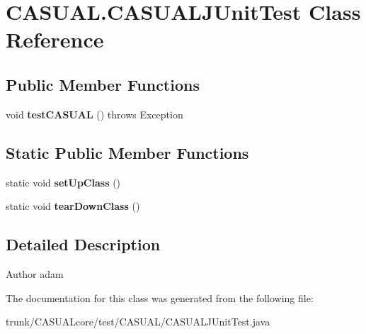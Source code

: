 \hypertarget{classCASUAL_1_1CASUALJUnitTest}{\section{C\-A\-S\-U\-A\-L.\-C\-A\-S\-U\-A\-L\-J\-Unit\-Test Class Reference}
\label{classCASUAL_1_1CASUALJUnitTest}
}
\subsection*{Public Member Functions}
\begin{DoxyCompactItemize}
\item 
\hypertarget{classCASUAL_1_1CASUALJUnitTest_af67e58268d5b80fe18aeb2aea142b7b3}{void {\bfseries test\-C\-A\-S\-U\-A\-L} ()  throws Exception }\label{classCASUAL_1_1CASUALJUnitTest_af67e58268d5b80fe18aeb2aea142b7b3}

\end{DoxyCompactItemize}
\subsection*{Static Public Member Functions}
\begin{DoxyCompactItemize}
\item 
\hypertarget{classCASUAL_1_1CASUALJUnitTest_a9980b2dad35ad98b8b71706481ef0cba}{static void {\bfseries set\-Up\-Class} ()}\label{classCASUAL_1_1CASUALJUnitTest_a9980b2dad35ad98b8b71706481ef0cba}

\item 
\hypertarget{classCASUAL_1_1CASUALJUnitTest_ad619544ffa44246299a867cfb80ef7fa}{static void {\bfseries tear\-Down\-Class} ()}\label{classCASUAL_1_1CASUALJUnitTest_ad619544ffa44246299a867cfb80ef7fa}

\end{DoxyCompactItemize}


\subsection{Detailed Description}
\begin{DoxyAuthor}{Author}
adam 
\end{DoxyAuthor}


The documentation for this class was generated from the following file\-:\begin{DoxyCompactItemize}
\item 
trunk/\-C\-A\-S\-U\-A\-Lcore/test/\-C\-A\-S\-U\-A\-L/C\-A\-S\-U\-A\-L\-J\-Unit\-Test.\-java\end{DoxyCompactItemize}

